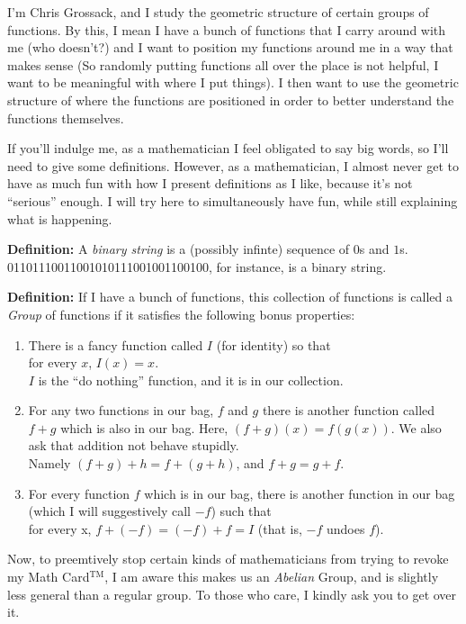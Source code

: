 \documentclass{article}[12]
\begin{document}
I'm Chris Grossack, and I study the geometric structure of certain groups of functions.
By this, I mean I have a bunch of functions that I carry around with me 
(who doesn't?) and I want to position my functions around me in a way that
makes sense (So randomly putting functions all over the place is not helpful,
I want to be meaningful with where I put things). I then want to use the
geometric structure of where the functions are positioned in order to better
understand the functions themselves.

If you'll indulge me, as a mathematician I feel obligated to say big words,
so I'll need to give some definitions. However, as a mathematician, I almost
never get to have as much fun with how I present definitions as I like, 
because it's not ``serious'' enough. I will try here to simultaneously
have fun, while still explaining what is happening.

\textbf{Definition:}
A \emph{binary string} is a (possibly infinte) sequence of $0$s and $1$s.
01101110011001010111001001100100, for instance, is a binary string.

\textbf{Definition:}
If I have a bunch of functions, this collection of functions is called a 
\emph{Group} of functions if it satisfies the following bonus properties:

\begin{enumerate}
  \item There is a fancy function called $I$ (for identity) so that \\
    for every $x$, $I(x) = x$.\\
    $I$ is the ``do nothing'' function,
    and it is in our collection.

  \item For any two functions in our bag, $f$ and $g$ there is another 
    function called $f + g$ which is also in our bag. Here,
    $(f + g)(x) = f(g(x))$. We also ask that addition not behave stupidly. \\
    Namely $(f + g) + h = f + (g + h)$, and $f + g = g + f$.
    
  \item For every function $f$ which is in our bag, there is another
    function in our bag (which I will suggestively call $-f$) 
    such that \\
    for every x, $f + (-f) = (-f) + f = I$ (that is, $-f$ undoes $f$).
\end{enumerate}

Now, to preemtively stop certain kinds of mathematicians from trying to
revoke my Math Card$^{\text{TM}}$, I am aware this makes us an \emph{Abelian}
Group, and is slightly less general than a regular group. To those who care, 
I kindly ask you to get over it.
\end{document}

